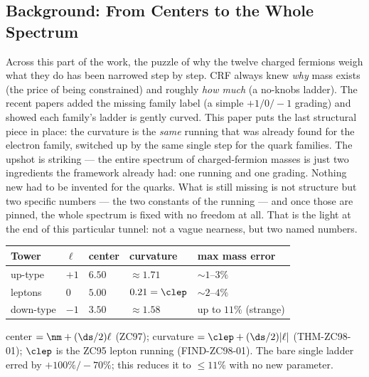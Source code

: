 \documentclass[12pt, a4paper]{article}
\begin{document}
\subsection{Background: From Centers to the Whole Spectrum}
\label{sec:background-zc98}

\begin{keybox}[title={If you are just arriving --- ZC98 in plain language}]
\sloppy
Across this part of the work, the puzzle of why the twelve charged fermions
weigh what they do has been narrowed step by step. CRF always knew \emph{why}
mass exists (the price of being constrained) and roughly \emph{how much} (a
no-knobs ladder). The recent papers added the missing family label (a simple
$+1/0/-1$ grading) and showed each family's ladder is gently curved. This paper
puts the last structural piece in place: the curvature is the \emph{same}
running that was already found for the electron family, switched up by the same
single step for the quark families. The upshot is striking --- the entire
spectrum of charged-fermion masses is just two ingredients the framework already
had: one running and one grading. Nothing new had to be invented for the quarks.
What is still missing is not structure but two specific numbers --- the two
constants of the running --- and once those are pinned, the whole spectrum is
fixed with no freedom at all. That is the light at the end of this particular
tunnel: not a vague nearness, but two named numbers.
\end{keybox}

\begin{keybox}[title={Numerical Summary --- the closed spectrum (common scale $\Mz$)}]
{\footnotesize\renewcommand{\arraystretch}{1.3}
\begin{center}
\begin{tabular}{@{}p{2.6cm}p{1.2cm}p{2.1cm}p{2.1cm}p{2.6cm}@{}}
\toprule
\textbf{Tower} & \textbf{$\ell$} & \textbf{center} & \textbf{curvature} &
\textbf{max mass error} \\
\midrule
up-type   & $+1$ & $6.50$ & $\approx1.71$ & $\sim 1$--$3\%$ \\
leptons   & $0$  & $5.00$ & $0.21=\clep$  & $\sim 2$--$4\%$ \\
down-type & $-1$ & $3.50$ & $\approx1.58$ & up to $11\%$ (strange) \\
\bottomrule
\end{tabular}
\end{center}}
\smallskip
\footnotesize center $=\nm+(\ds/2)\ell$ (ZC97); curvature $=\clep+(\ds/2)|\ell|$
(THM-ZC98-01); $\clep$ is the ZC95 lepton running (FIND-ZC98-01). The bare
single ladder erred by $+100\%/-70\%$; this reduces it to $\le11\%$ with no new
parameter.
\end{keybox}
\end{document}
